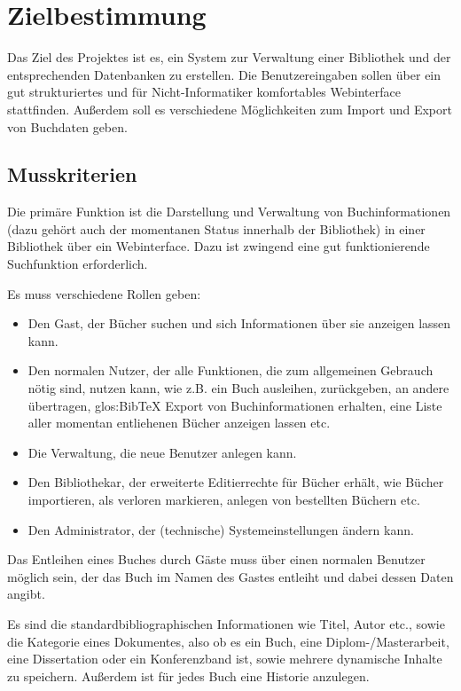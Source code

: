 
\chapter{Zielbestimmung}
Das Ziel des Projektes ist es, ein System zur Verwaltung einer Bibliothek und der entsprechenden Datenbanken zu erstellen. Die Benutzereingaben sollen über ein gut strukturiertes und für Nicht-Informatiker komfortables Webinterface stattfinden. Außerdem soll es verschiedene Möglichkeiten zum Import und Export von Buchdaten geben. 

\section{Musskriterien}
Die primäre Funktion ist die Darstellung und Verwaltung von Buchinformationen (dazu gehört auch der momentanen Status innerhalb der Bibliothek) in einer Bibliothek über ein Webinterface. Dazu ist zwingend eine gut funktionierende Suchfunktion erforderlich.

Es muss verschiedene Rollen geben:
\begin{itemize}
  \item Den Gast, der Bücher suchen und sich Informationen über sie anzeigen lassen kann.
  \item Den normalen Nutzer, der alle Funktionen, die zum allgemeinen Gebrauch nötig sind, nutzen kann, wie z.B. ein Buch ausleihen, zurückgeben, an andere übertragen, \gls{glos:BibTeX} Export von Buchinformationen erhalten, eine Liste aller momentan entliehenen Bücher anzeigen lassen etc.
  \item Die Verwaltung, die neue Benutzer anlegen kann.
  \item Den Bibliothekar, der erweiterte Editierrechte für Bücher erhält, wie Bücher importieren, als verloren markieren, anlegen von bestellten Büchern etc.
\item Den Administrator, der (technische) Systemeinstellungen ändern kann.
\end{itemize}

Das Entleihen eines Buches durch Gäste muss über einen normalen Benutzer möglich sein, der das Buch im Namen des Gastes entleiht und dabei dessen Daten angibt. 

Es sind die standardbibliographischen Informationen wie Titel, Autor etc., sowie die Kategorie eines Dokumentes, also ob es ein Buch, eine Diplom-/Masterarbeit, eine Dissertation oder ein Konferenzband ist, sowie mehrere dynamische Inhalte zu speichern. Außerdem ist für jedes Buch eine Historie anzulegen. 


